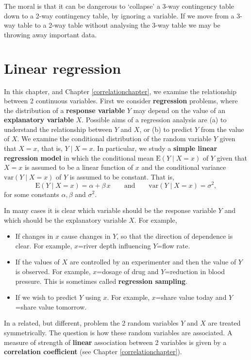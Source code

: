 \documentclass[
  british,
  11pt,
  openany, a4paper]{book}
\providecommand{\tightlist}{%
  \setlength{\itemsep}{0pt}\setlength{\parskip}{0pt}}
\begin{document}
The moral is that it can be dangerous to `collapse' a 3-way contingency table down to a 2-way contingency table, by ignoring a variable. If we move from a 3-way table to a 2-way table without analysing the 3-way table we may be throwing away important data.

\chapter{Linear regression}\label{linreg}

In this chapter, and Chapter \ref{correlationchapter}, we examine the relationship between 2 continuous variables. First we consider \textbf{regression} problems, where the distribution of a \textbf{response variable} \(Y\) may depend on the value of an \textbf{explanatory variable} \(X\). Possible aims of a regression analysis are (a) to understand the relationship between \(Y\) and \(X\), or (b) to predict \(Y\) from the value of \(X\). We examine the conditional distribution of the random variable \(Y\) given that \(X=x\), that is, \(Y \mid X=x\). In particular, we study a \textbf{simple linear regression model} in which the conditional mean \(\text{E}(Y \mid X=x)\) of \(Y\) given that \(X=x\) is assumed to be a linear function of \(x\) and the conditional variance \(\text{var}(Y \mid X=x)\) of \(Y\) is assumed to be constant. That is,
\[ \text{E}(Y \mid X=x) = \alpha+\beta\,x \qquad \text{and} \qquad \text{var}(Y \mid X=x)=\sigma^2, \]
for some constants \(\alpha, \beta\) and \(\sigma^2\).

In many cases it is clear which variable should be the response variable \(Y\) and which should be the explanatory variable \(X\). For example,

\begin{itemize}
\tightlist
\item
  If changes in \(x\) cause changes in \(Y\), so that the direction of dependence is clear. For example, \(x\)=river depth influencing \(Y\)=flow rate.
\item
  If the values of \(X\) are controlled by an experimenter and then the value of \(Y\) is observed. For example, \(x\)=dosage of drug and \(Y\)=reduction in blood pressure. This is sometimes called \textbf{regression sampling}.
\item
  If we wish to predict \(Y\) using \(x\). For example, \(x\)=share value today and \(Y\)=share value tomorrow.
\end{itemize}

In a related, but different, problem the 2 random variables \(Y\) and \(X\) are treated symmetrically. The question is how these random variables are associated. A measure of strength of \textbf{linear} association between 2 variables is given by a \textbf{correlation coefficient} (see Chapter \ref{correlationchapter}).
\end{document}
